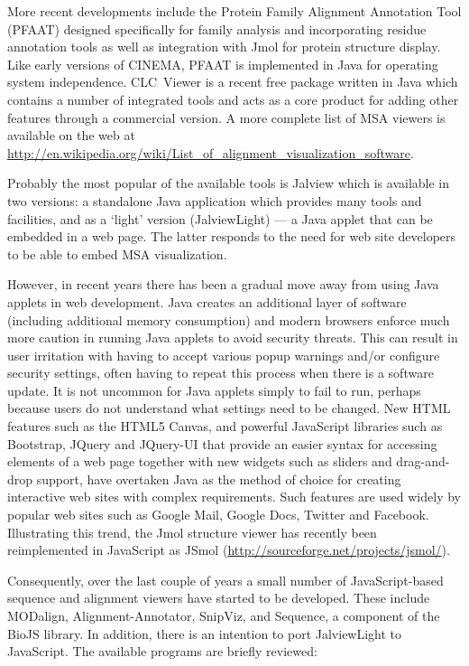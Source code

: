 \documentclass{article}
\begin{document}
More recent developments include the Protein Family Alignment
Annotation Tool (PFAAT)\cite{johnson:pfaat} designed specifically for
family analysis and incorporating residue annotation tools as well as
integration with Jmol for protein structure display. Like early
versions of CINEMA, PFAAT is implemented in Java for operating system
independence. CLC~Viewer is a recent free package written in Java
which contains a number of integrated tools and acts as a core product
for adding other features through a commercial version.  A more
complete list of MSA viewers is available on the web at
\url{http://en.wikipedia.org/wiki/List_of_alignment_visualization_software}.

Probably the most popular of the available tools is
Jalview\cite{clamp:jalview} which is available in two versions: a
standalone Java application which provides many tools and facilities,
and as a `light' version (JalviewLight) --- a Java applet that can be
embedded in a web page. The latter responds to the need for web site
developers to be able to embed MSA visualization.

However, in recent years there has been a gradual move away from using
Java applets in web development.  Java creates an additional layer of
software (including additional memory consumption) and modern browsers
enforce much more caution in running Java applets to avoid security
threats. This can result in user irritation with having to accept
various popup warnings and/or configure security settings, often
having to repeat this process when there is a software update. It is
not uncommon for Java applets simply to fail to run, perhaps because
users do not understand what settings need to be changed.  New HTML
features such as the HTML5 Canvas, and powerful JavaScript libraries
such as Bootstrap, JQuery and JQuery-UI that provide an easier syntax
for accessing elements of a web page together with new widgets such as
sliders and drag-and-drop support, have overtaken Java as the method
of choice for creating interactive web sites with complex
requirements.  Such features are used widely by popular web sites such
as Google Mail, Google Docs, Twitter and Facebook.  Illustrating this
trend, the Jmol structure viewer has recently been reimplemented in
JavaScript as JSmol (\url{http://sourceforge.net/projects/jsmol/}).

Consequently, over the last couple of years a small number of
JavaScript-based sequence and alignment viewers have started to be
developed. These include MODalign\cite{barbato:modalign},
Alignment-Annotator\cite{gille:2014aa}, SnipViz\cite{jaschob:2014},
and Sequence\cite{gomez:2014}, a component of the BioJS
library\cite{corpas:biojs}. In addition, there is an intention to port
JalviewLight to JavaScript.  The available programs are briefly
reviewed:
\end{document}
